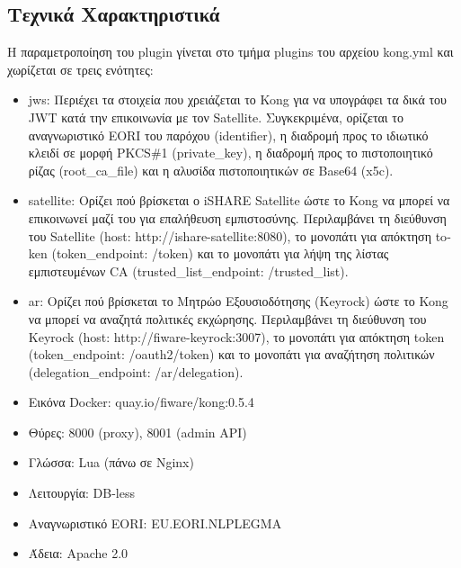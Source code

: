 \subsection{Τεχνικά Χαρακτηριστικά}
\label{subsec:kong-tech}

Η παραμετροποίηση του \textlatin{plugin} γίνεται στο τμήμα
\textlatin{plugins} του αρχείου \textlatin{kong.yml} και χωρίζεται σε
τρεις ενότητες:

\begin{itemize}
    \item \textlatin{jws}: Περιέχει τα στοιχεία που χρειάζεται
    το \textlatin{Kong} για να υπογράφει τα δικά του \textlatin{JWT}
    κατά την επικοινωνία με τον \textlatin{Satellite}. Συγκεκριμένα,
    ορίζεται το αναγνωριστικό \textlatin{EORI} του παρόχου
    (\textlatin{identifier}), η διαδρομή προς το ιδιωτικό κλειδί σε
    μορφή \textlatin{PKCS\#1} (\textlatin{private\_key}), η διαδρομή
    προς το πιστοποιητικό ρίζας (\textlatin{root\_ca\_file}) και η
    αλυσίδα πιστοποιητικών σε \textlatin{Base64} (\textlatin{x5c}).

    \item \textlatin{satellite}: Ορίζει πού βρίσκεται ο
    \textlatin{iSHARE Satellite} ώστε το \textlatin{Kong} να μπορεί
    να επικοινωνεί μαζί του για επαλήθευση εμπιστοσύνης. Περιλαμβάνει
    τη διεύθυνση του \textlatin{Satellite}
    (\textlatin{host: http://ishare-satellite:8080}), το μονοπάτι για
    απόκτηση \textlatin{token} (\textlatin{token\_endpoint: /token})
    και το μονοπάτι για λήψη της λίστας εμπιστευμένων \textlatin{CA}
    (\textlatin{trusted\_list\_endpoint: /trusted\_list}).

    \item \textlatin{ar}: Ορίζει πού βρίσκεται το Μητρώο
    Εξουσιοδότησης (\textlatin{Keyrock}) ώστε το \textlatin{Kong}
    να μπορεί να αναζητά πολιτικές εκχώρησης. Περιλαμβάνει τη
    διεύθυνση του \textlatin{Keyrock}
    (\textlatin{host: http://fiware-keyrock:3007}), το μονοπάτι για
    απόκτηση \textlatin{token}
    (\textlatin{token\_endpoint: /oauth2/token}) και το μονοπάτι για
    αναζήτηση πολιτικών
    (\textlatin{delegation\_endpoint: /ar/delegation}).
\end{itemize}

\begin{itemize}
    \item Εικόνα \textlatin{Docker}:
    \textlatin{quay.io/fiware/kong:0.5.4}
    \item Θύρες: \textlatin{8000} (\textlatin{proxy}),
    \textlatin{8001} (\textlatin{admin API})
    \item Γλώσσα: \textlatin{Lua} (πάνω σε \textlatin{Nginx})
    \item Λειτουργία: \textlatin{DB-less}
    \item Αναγνωριστικό \textlatin{EORI}:
    \textlatin{EU.EORI.NLPLEGMA}
    \item Άδεια: \textlatin{Apache 2.0}
\end{itemize}

